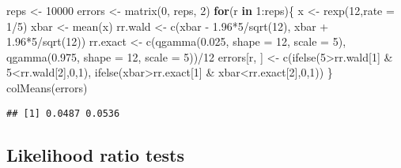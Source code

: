 \documentclass[
]{book}
\newenvironment{Shaded}{\begin{snugshade}}{\end{snugshade}}
\newcommand{\AttributeTok}[1]{\textcolor[rgb]{0.77,0.63,0.00}{#1}}
\newcommand{\ControlFlowTok}[1]{\textcolor[rgb]{0.13,0.29,0.53}{\textbf{#1}}}
\newcommand{\DecValTok}[1]{\textcolor[rgb]{0.00,0.00,0.81}{#1}}
\newcommand{\FloatTok}[1]{\textcolor[rgb]{0.00,0.00,0.81}{#1}}
\newcommand{\FunctionTok}[1]{\textcolor[rgb]{0.00,0.00,0.00}{#1}}
\newcommand{\NormalTok}[1]{#1}
\newcommand{\OtherTok}[1]{\textcolor[rgb]{0.56,0.35,0.01}{#1}}
\newcommand{\SpecialCharTok}[1]{\textcolor[rgb]{0.00,0.00,0.00}{#1}}
\begin{document}
\begin{Shaded}
\begin{Highlighting}[]
\NormalTok{reps }\OtherTok{\textless{}{-}} \DecValTok{10000}
\NormalTok{errors }\OtherTok{\textless{}{-}} \FunctionTok{matrix}\NormalTok{(}\DecValTok{0}\NormalTok{, reps, }\DecValTok{2}\NormalTok{)}
\ControlFlowTok{for}\NormalTok{(r }\ControlFlowTok{in} \DecValTok{1}\SpecialCharTok{:}\NormalTok{reps)\{}
\NormalTok{  x }\OtherTok{\textless{}{-}} \FunctionTok{rexp}\NormalTok{(}\DecValTok{12}\NormalTok{,}\AttributeTok{rate =} \DecValTok{1}\SpecialCharTok{/}\DecValTok{5}\NormalTok{)}
\NormalTok{  xbar }\OtherTok{\textless{}{-}} \FunctionTok{mean}\NormalTok{(x)}
\NormalTok{  rr.wald }\OtherTok{\textless{}{-}} \FunctionTok{c}\NormalTok{(xbar }\SpecialCharTok{{-}} \FloatTok{1.96}\SpecialCharTok{*}\DecValTok{5}\SpecialCharTok{/}\FunctionTok{sqrt}\NormalTok{(}\DecValTok{12}\NormalTok{), xbar }\SpecialCharTok{+} \FloatTok{1.96}\SpecialCharTok{*}\DecValTok{5}\SpecialCharTok{/}\FunctionTok{sqrt}\NormalTok{(}\DecValTok{12}\NormalTok{))}
\NormalTok{  rr.exact }\OtherTok{\textless{}{-}} \FunctionTok{c}\NormalTok{(}\FunctionTok{qgamma}\NormalTok{(}\FloatTok{0.025}\NormalTok{, }\AttributeTok{shape =} \DecValTok{12}\NormalTok{, }\AttributeTok{scale =} \DecValTok{5}\NormalTok{), }\FunctionTok{qgamma}\NormalTok{(}\FloatTok{0.975}\NormalTok{, }\AttributeTok{shape =} \DecValTok{12}\NormalTok{, }\AttributeTok{scale =} \DecValTok{5}\NormalTok{))}\SpecialCharTok{/}\DecValTok{12}
\NormalTok{  errors[r, ] }\OtherTok{\textless{}{-}} \FunctionTok{c}\NormalTok{(}\FunctionTok{ifelse}\NormalTok{(}\DecValTok{5}\SpecialCharTok{\textgreater{}}\NormalTok{rr.wald[}\DecValTok{1}\NormalTok{] }\SpecialCharTok{\&} \DecValTok{5}\SpecialCharTok{\textless{}}\NormalTok{rr.wald[}\DecValTok{2}\NormalTok{],}\DecValTok{0}\NormalTok{,}\DecValTok{1}\NormalTok{), }\FunctionTok{ifelse}\NormalTok{(xbar}\SpecialCharTok{\textgreater{}}\NormalTok{rr.exact[}\DecValTok{1}\NormalTok{] }\SpecialCharTok{\&}\NormalTok{ xbar}\SpecialCharTok{\textless{}}\NormalTok{rr.exact[}\DecValTok{2}\NormalTok{],}\DecValTok{0}\NormalTok{,}\DecValTok{1}\NormalTok{))}
\NormalTok{\}}
\FunctionTok{colMeans}\NormalTok{(errors)}
\end{Highlighting}
\end{Shaded}

\begin{verbatim}
## [1] 0.0487 0.0536
\end{verbatim}

\hypertarget{likelihood-ratio-tests}{%
\subsection{Likelihood ratio tests}\label{likelihood-ratio-tests}}
\end{document}

